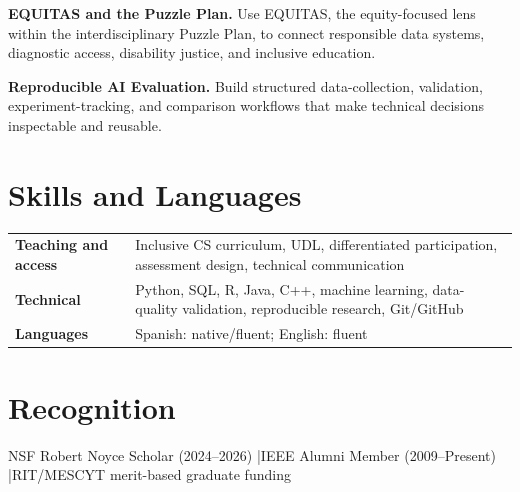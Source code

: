 \documentclass[10pt,letterpaper]{article}
\begin{document}
\textbf{EQUITAS and the Puzzle Plan.}
Use EQUITAS, the equity-focused lens within the interdisciplinary Puzzle Plan,
to connect responsible data systems, diagnostic access, disability justice,
and inclusive education.

\textbf{Reproducible AI Evaluation.}
Build structured data-collection, validation, experiment-tracking, and
comparison workflows that make technical decisions inspectable and reusable.

\section*{Skills and Languages}
\begin{tabularx}{\textwidth}{@{}>{\bfseries}l X@{}}
Teaching and access & Inclusive CS curriculum, UDL, differentiated participation, assessment design, technical communication\\
Technical & Python, SQL, R, Java, C++, machine learning, data-quality validation, reproducible research, Git/GitHub\\
Languages & Spanish: native/fluent; English: fluent\\
\end{tabularx}

\section*{Recognition}
NSF Robert Noyce Scholar (2024--2026)
\enspace|\enspace IEEE Alumni Member (2009--Present)
\enspace|\enspace RIT/MESCYT merit-based graduate funding
\end{document}
